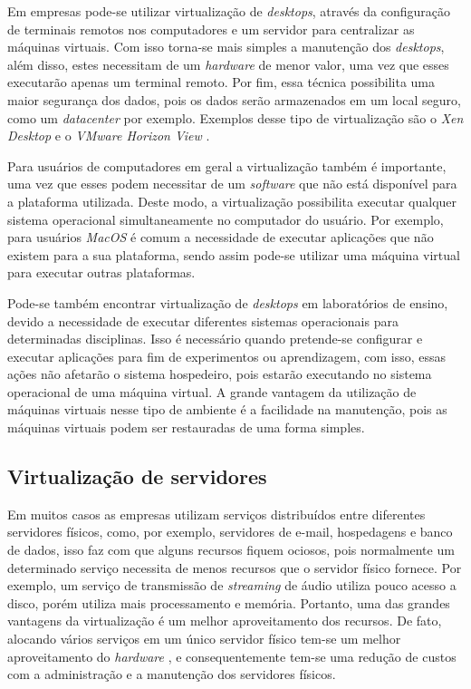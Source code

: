 Em empresas pode-se utilizar virtualização de \textit{desktops}, através da configuração de terminais remotos nos computadores e um servidor 
para centralizar as máquinas virtuais. Com isso torna-se mais simples a manutenção dos \textit{desktops}, além disso, estes necessitam de um 
\textit{hardware} de menor valor, uma vez que esses executarão apenas um terminal remoto. Por fim, essa técnica possibilita uma maior segurança 
dos dados, pois os dados serão armazenados em um local seguro, como um \textit{datacenter} por exemplo. Exemplos desse tipo de virtualização 
são o \textit{Xen Desktop} \cite{xendesktop} e o \textit{VMware Horizon View} \cite{vmwareview}.

Para usuários de computadores em geral a virtualização também é importante, uma vez que esses podem necessitar de um \textit{software} que não
está disponível para a plataforma utilizada. Deste modo, a virtualização possibilita executar qualquer sistema operacional simultaneamente no 
computador do usuário. Por exemplo, para usuários \textit{MacOS} é comum a necessidade de executar aplicações que não existem para a sua 
plataforma, sendo assim pode-se utilizar uma máquina virtual para executar outras plataformas.

Pode-se também encontrar virtualização de \textit{desktops} em laboratórios de ensino, devido a necessidade de executar diferentes sistemas 
operacionais para determinadas disciplinas. Isso é necessário quando pretende-se configurar e executar aplicações para fim de experimentos ou
aprendizagem, com isso, essas ações não afetarão o sistema hospedeiro, pois estarão executando no sistema operacional de uma máquina virtual. 
A grande vantagem da utilização de máquinas virtuais nesse tipo de ambiente é a facilidade na manutenção, pois as máquinas virtuais podem
ser restauradas de uma forma simples.

\subsection{Virtualização de servidores}
\label{section:virtdesk}

Em muitos casos as empresas utilizam serviços distribuídos entre diferentes servidores físicos, como, por exemplo, servidores de e-mail, 
hospedagens e banco de dados, isso faz com que alguns recursos fiquem ociosos, pois normalmente um determinado serviço necessita de menos
recursos que o servidor físico fornece. Por exemplo, um serviço de transmissão de \textit{streaming} de áudio utiliza pouco acesso a disco,
porém utiliza mais processamento e memória.
Portanto, uma das grandes vantagens da virtualização é um melhor aproveitamento dos recursos. De fato, alocando vários serviços em um único 
servidor físico tem-se um melhor aproveitamento do \textit{hardware} \cite{moreira2006}, e consequentemente tem-se uma redução de custos com a 
administração e a manutenção dos servidores físicos.

